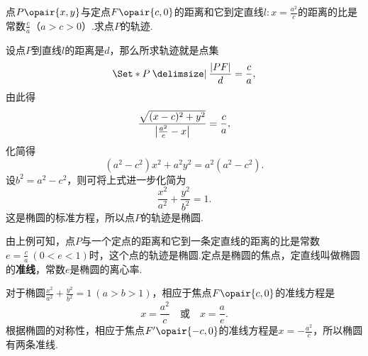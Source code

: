 \begin{example}
点\(P\opair{x,y}\)与定点\(F\opair{c,0}\)的距离和它到定直线\(l: x = \frac{a^2}{c}\)的距离的比是常数\(\frac{c}{a}\)（\(a > c > 0\)）.求点\(P\)的轨迹.
\begin{solution}
设点\(P\)到直线\(l\)的距离是\(d\)，那么所求轨迹就是点集\[
\Set*{ P \given \frac{\abs{PF}}{d} = \frac{c}{a} },
\]由此得\[
\frac{\sqrt{(x-c)^2+y^2}}{\abs{\frac{a^2}{c}-x}} = \frac{c}{a},
\]化简得\[
(a^2-c^2)x^2 + a^2 y^2 = a^2(a^2-c^2).
\]设\(b^2=a^2-c^2\)，则可将上式进一步化简为\[
\frac{x^2}{a^2}+\frac{y^2}{b^2}=1.
\]这是椭圆的标准方程，所以点\(P\)的轨迹是椭圆.
\end{solution}

由上例可知，点\(P\)与一个定点的距离和它到一条定直线的距离的比是常数\(e = \frac{c}{a}\ (0 < e < 1)\)时，这个点的轨迹是椭圆.定点是椭圆的焦点，定直线叫做椭圆的\textbf{准线}，常数\(e\)是椭圆的离心率.

对于椭圆\(\frac{x^2}{a^2}+\frac{y^2}{b^2}=1\ (a>b>1)\)，相应于焦点\(F\opair{c,0}\)的准线方程是\[
x = \frac{a^2}{c}
\quad\text{或}\quad
x = \frac{a}{e}.
\]根据椭圆的对称性，相应于焦点\(F'\opair{-c,0}\)的准线方程是\(x=-\frac{a^2}{c}\)，所以椭圆有两条准线.
\end{example}

